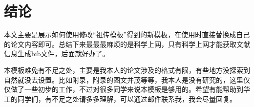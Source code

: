 \chapter{结\texorpdfstring{\quad}{}论}
本文主要是展示如何使用修改“祖传模板”得到的新模板，在使用时直接替换成自己的论文内容即可。总结下来最最最麻烦的是科学上网，只有科学上网才能获取文献信息生成bib文件，后面就好办了。

本模板难免有不足之处，主要是我本人的论文涉及的格式有限，有些地方没探索到自然就没去设置。比如附录，附录的图文并茂等等，我本人是没有研究的，这里仅仅做了一些初步的工作，不过对很多同学来说本模板是够用的。希望有能帮助到华工的同学们，有不足之处请多多理解，可以通过邮件联系我，我会尽量回复。
